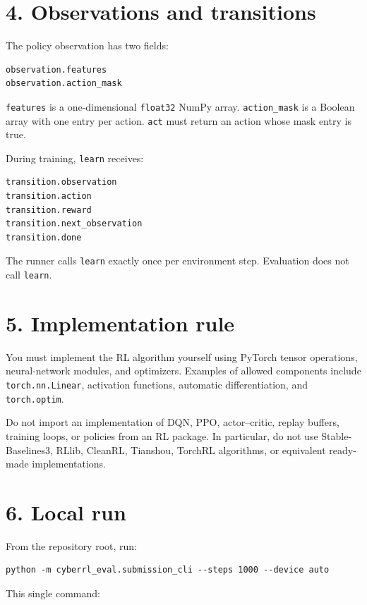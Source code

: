 \documentclass[12pt]{report}
\begin{document}
\section*{4. Observations and transitions}

The policy observation has two fields:

\begin{verbatim}
observation.features
observation.action_mask
\end{verbatim}

\texttt{features} is a one-dimensional \texttt{float32} NumPy array.
\texttt{action\_mask} is a Boolean array with one entry per action.
\texttt{act} must return an action whose mask entry is true.

During training, \texttt{learn} receives:

\begin{verbatim}
transition.observation
transition.action
transition.reward
transition.next_observation
transition.done
\end{verbatim}

The runner calls \texttt{learn} exactly once per environment step. Evaluation
does not call \texttt{learn}.

\section*{5. Implementation rule}

You must implement the RL algorithm yourself using PyTorch tensor operations,
neural-network modules, and optimizers. Examples of allowed components include
\texttt{torch.nn.Linear}, activation functions, automatic differentiation,
and \texttt{torch.optim}.

Do not import an implementation of DQN, PPO, actor--critic, replay buffers,
training loops, or policies from an RL package. In particular, do not use
Stable-Baselines3, RLlib, CleanRL, Tianshou, TorchRL algorithms, or equivalent
ready-made implementations.

\section*{6. Local run}

From the repository root, run:

\begin{verbatim}
python -m cyberrl_eval.submission_cli --steps 1000 --device auto
\end{verbatim}

This single command:
\end{document}
